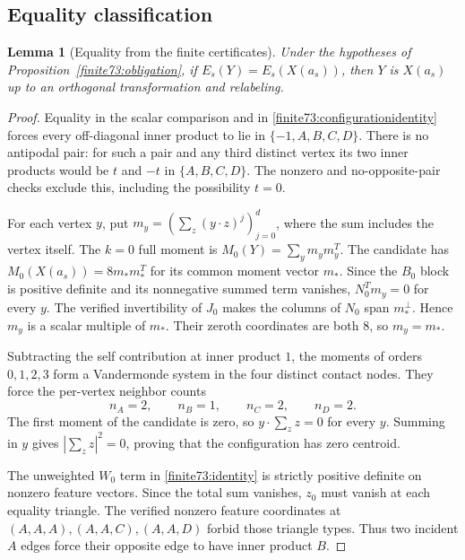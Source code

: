\documentclass[12pt,reqno]{amsart}
\newtheorem{lemma}[theorem]{Lemma}
\theoremstyle{definition}
\numberwithin{equation}{section}
\begin{document}
\subsection{Equality classification}
\begin{lemma}[Equality from the finite certificates]\label{finite73:equality}
Under the hypotheses of Proposition~\ref{finite73:obligation}, if $E_s(Y)=E_s(X(a_s))$, then $Y$ is $X(a_s)$ up to an orthogonal transformation and relabeling.
\end{lemma}
\begin{proof}
Equality in the scalar comparison and in \eqref{finite73:configurationidentity} forces every off-diagonal inner product to lie in $\{-1,A,B,C,D\}$. There is no antipodal pair: for such a pair and any third distinct vertex its two inner products would be $t$ and $-t$ in $\{A,B,C,D\}$. The nonzero and no-opposite-pair checks exclude this, including the possibility $t=0$.

For each vertex $y$, put $m_y=(\sum_z(y\cdot z)^j)_{j=0}^{d}$, where the sum includes the vertex itself. The $k=0$ full moment is $M_0(Y)=\sum_y m_y m_y^T$. The candidate has $M_0(X(a_s))=8m_*m_*^T$ for its common moment vector $m_*$. Since the $B_0$ block is positive definite and its nonnegative summed term vanishes, $N_0^Tm_y=0$ for every $y$. The verified invertibility of $J_0$ makes the columns of $N_0$ span $m_*^\perp$. Hence $m_y$ is a scalar multiple of $m_*$. Their zeroth coordinates are both $8$, so $m_y=m_*$.

Subtracting the self contribution at inner product $1$, the moments of orders $0,1,2,3$ form a Vandermonde system in the four distinct contact nodes. They force the per-vertex neighbor counts
\begin{equation}\label{finite73:neighbors}
 n_A=2,\qquad n_B=1,\qquad n_C=2,\qquad n_D=2.
\end{equation}
The first moment of the candidate is zero, so $y\cdot\sum_z z=0$ for every $y$. Summing in $y$ gives $|\sum_z z|^2=0$, proving that the configuration has zero centroid.

The unweighted $W_0$ term in \eqref{finite73:identity} is strictly positive definite on nonzero feature vectors. Since the total sum vanishes, $z_0$ must vanish at each equality triangle. The verified nonzero feature coordinates at $(A,A,A),(A,A,C),(A,A,D)$ forbid those triangle types. Thus two incident $A$ edges force their opposite edge to have inner product $B$.


\end{proof}
\end{document}

